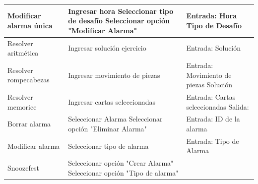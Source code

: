 \begin{table}[H]
\begin{tabular}{|p{4cm}|p{5cm}|p{5cm}|}
 \\ \hline
    Modificar alarma única &
    Ingresar hora\newline
    Seleccionar tipo de desafío\newline
    Seleccionar opción "Modificar Alarma"
    &
    Entrada:\newline
    Hora\newline
    Tipo de Desafío\newline
 \\ \hline
    Resolver aritmética &
    Ingresar solución ejercicio\newline
    &
    Entrada:\newline
    Solución\newline
 \\ \hline
    Resolver rompecabezas &
    Ingresar movimiento de piezas
    &
    Entrada:\newline
    Movimiento de piezas\newline
    Solución\newline

 \\ \hline
    Resolver memorice &
    Ingresar cartas seleccionadas
    &
    Entrada:\newline
    2 Cartas seleccionadas\newline
    Salida:

 \\ \hline
    Borrar alarma &
    Seleccionar Alarma\newline
    Seleccionar opción "Eliminar Alarma"
    &
    Entrada:\newline
    ID de la alarma\newline
 \\ \hline
    Modificar alarma &
    Seleccionar tipo de alarma\newline
    &
    Entrada:\newline
    Tipo de Alarma\newline
 \\ \hline
    Snoozefest &
    Seleccionar opción "Crear Alarma"\newline
    Seleccionar opción "Tipo de alarma"\newline
    &
    \\ \hline
\end{tabular}
    
    \label{table:3}
\end{table}
